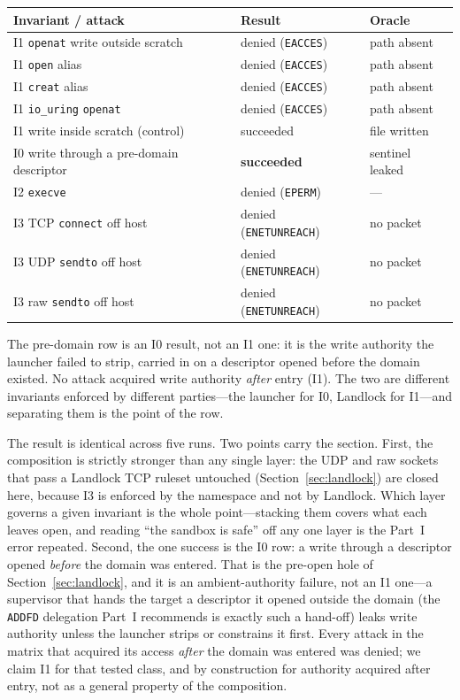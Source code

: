 \documentclass[11pt]{article}
\begin{document}
\begin{center}
\begin{tabular}{lll}
\toprule
Invariant / attack & Result & Oracle \\
\midrule
I1 \texttt{openat} write outside scratch    & denied (\texttt{EACCES})     & path absent \\
I1 \texttt{open} alias                       & denied (\texttt{EACCES})     & path absent \\
I1 \texttt{creat} alias                      & denied (\texttt{EACCES})     & path absent \\
I1 \texttt{io\_uring} \texttt{openat}        & denied (\texttt{EACCES})     & path absent \\
I1 write inside scratch (control)            & succeeded                    & file written \\
I0 write through a pre-domain descriptor     & \textbf{succeeded}           & sentinel leaked \\
I2 \texttt{execve}                           & denied (\texttt{EPERM})      & --- \\
I3 TCP \texttt{connect} off host             & denied (\texttt{ENETUNREACH})& no packet \\
I3 UDP \texttt{sendto} off host              & denied (\texttt{ENETUNREACH})& no packet \\
I3 raw \texttt{sendto} off host              & denied (\texttt{ENETUNREACH})& no packet \\
\bottomrule
\end{tabular}
\end{center}

The pre-domain row is an I0 result, not an I1 one: it is the write authority the launcher failed to
strip, carried in on a descriptor opened before the domain existed. No attack acquired write authority
\emph{after} entry (I1). The two are different invariants enforced by different parties---the launcher for
I0, Landlock for I1---and separating them is the point of the row.

The result is identical across five runs. Two points carry the section. First, the composition is
strictly stronger than any single layer: the UDP and raw sockets that pass a Landlock TCP ruleset
untouched (Section~\ref{sec:landlock}) are closed here, because I3 is enforced by the namespace and not by
Landlock. Which layer governs a given invariant is the whole point---stacking them covers what each leaves
open, and reading ``the sandbox is safe'' off any one layer is the Part~I error repeated. Second, the one
success is the I0 row: a write through a descriptor opened \emph{before} the domain was entered. That is
the pre-open hole of Section~\ref{sec:landlock}, and it is an ambient-authority failure, not an I1 one---a
supervisor that hands the target a descriptor it opened outside the domain (the \texttt{ADDFD} delegation
Part~I recommends is exactly such a hand-off) leaks write authority unless the launcher strips or
constrains it first. Every attack in the matrix that acquired its access \emph{after} the domain was
entered was denied; we claim I1 for that tested class, and by construction for authority acquired after
entry, not as a general property of the composition.
\end{document}
